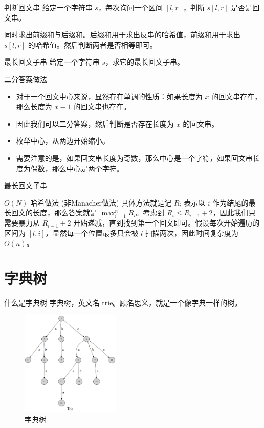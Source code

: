 \documentclass{ldr-simple-gray}
\begin{document}
  \begin{frame}{判断回文串}
    给定一个字符串 $s$，每次询问一个区间 $[l,r]$，判断 $s[l,r]$ 是否是回文串。\newline

    同时求出前缀和与后缀和。后缀和用于求出反串的哈希值，前缀和用于求出 $s[l,r]$ 的哈希值。然后判断两者是否相等即可。
  \end{frame}
  
  \begin{frame}{最长回文子串}
    给定一个字符串 $s$，求它的最长回文子串。
  
    \begin{block}{二分答案做法}
      \begin{itemize}
        \item 对于一个回文中心来说，显然存在单调的性质：如果长度为 $x$ 的回文串存在，那么长度为 $x-1$ 的回文串也存在。
        \item 因此我们可以二分答案，然后判断是否存在长度为 $x$ 的回文串。
        \item 枚举中心，从两边开始缩小。
        \item 需要注意的是，如果回文串长度为奇数，那么中心是一个字符，如果回文串长度为偶数，那么中心是两个字符。
      \end{itemize}
    \end{block}
  \end{frame}

  \begin{frame}{最长回文子串}
    \begin{block}{$O(N)$ 哈希做法 (非Manacher做法)}
      具体方法就是记 $R_i$ 表示以 $i$ 作为结尾的最长回文的长度，那么答案就是 
      $\max_{i=1}^nR_i$。考虑到 $R_i\leq R_{i-1}+2$，因此我们只需要暴力从 $R_{i-1}+2$ 开始递减，直到找到第一个回文即可。假设每次开始遍历的区间为 $[l,i]$，显然每一个位置最多只会被 $l$ 扫描两次，因此时间复杂度为 $O(n)$。
    \end{block}
  \end{frame}

  \section{字典树}
  \begin{frame}{什么是字典树}
    字典树，英文名 trie。顾名思义，就是一个像字典一样的树。
    \begin{figure}
      \centering
      \includegraphics[height=5cm]{./images/trie1.png}
      \caption{字典树}
    \end{figure}
  \end{frame}
\end{document}
